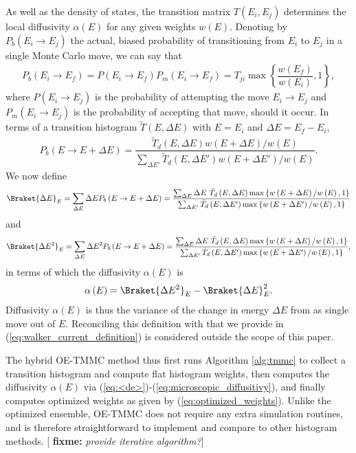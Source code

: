 \documentclass[11pt]{article}
\newcommand{\bk}{\Braket} %
\newcommand{\f}[2]{\dfrac{#1}{#2}} %
\newcommand{\p}[1]{\left(#1\right)} %
\renewcommand{\set}[1]{\left\{#1\right\}} %
\newcommand{\red}[1]{{\bf \color{red} #1}}
\newcommand{\fixme}[1]{[\red{fixme:} \emph{#1}]}
\begin{document}
As well as the density of states, the transition matrix $T\p{E_i,E_j}$
determines the local diffusivity $\alpha\p{E}$ for any given weights
$w\p{E}$. Denoting by $P_b\p{E_i\to E_j}$ the actual, biased
probability of transitioning from $E_i$ to $E_j$ in a single Monte
Carlo move, we can say that
\begin{align}
  P_b\p{E_i\to E_f}=P\p{E_i\to E_f}P_m\p{E_i\to E_f}
  =T_{ji}\max\set{\f{w\p{E_f}}{w\p{E_i}},1},
\end{align}
where $P\p{E_i\to E_j}$ is the probability of attempting the move
$E_i\to E_j$ and $P_m\p{E_i\to E_j}$ is the probability of accepting
that move, should it occur. In terms of a transition histogram $\tilde
T\p{E,\Delta E}$ with $E=E_i$ and $\Delta E=E_f-E_i$,
\begin{align}
  P_b\p{E\to E+\Delta E} =\f{\tilde T_d\p{E,\Delta E}w\p{E+\Delta
      E}/w\p{E}} {\sum_{\Delta E'}\tilde T_d\p{E,\Delta
      E'}w\p{E+\Delta E'}/w\p{E}}.
  \label{eq:actual_transition_prob}
\end{align}
We now define
\begin{align}
  \bk{\Delta E}_E=\sum_{\Delta E}\Delta E P_b\p{E\to E+\Delta E}
  =\f{\sum_{\Delta E}\Delta E~\tilde T_d\p{E,\Delta E}
    \max\set{w\p{E+\Delta E}/w\p{E},1}} {\sum_{\Delta E'}\tilde
    T_d\p{E,\Delta E'} \max\set{w\p{E+\Delta E'}/w\p{E},1}}
  \label{eq:<de>}
\end{align}
and
\begin{align}
  \bk{\Delta E^2}_E=\sum_{\Delta E}\Delta E^2 P_b\p{E\to E+\Delta E}
  =\f{\sum_{\Delta E}\Delta E~\tilde T_d\p{E,\Delta E}
    \max\set{w\p{E+\Delta E}/w\p{E},1}} {\sum_{\Delta E'}\tilde
    T_d\p{E,\Delta E'} \max\set{w\p{E+\Delta E'}/w\p{E},1}},
  \label{eq:<de^2>}
\end{align}
in terms of which the diffusivity $\alpha\p{E}$ is
\begin{align}
  \alpha\p{E}=\bk{\Delta E^2}_E -\bk{\Delta E}_E^2.
  \label{eq:microscopic_diffusitivy}
\end{align}
Diffusivity $\alpha\p{E}$ is thus the variance of the change in energy
$\Delta E$ from as single move out of $E$. Reconciling this definition
with that we provide in (\ref{eq:walker_current_definition}) is
considered outside the scope of this paper.

The hybrid OE-TMMC method thus first runs Algorithm \ref{alg:tmmc} to
collect a transition histogram and compute flat histogram weights,
then computes the diffusivity $\alpha\p{E}$ via
(\ref{eq:<de>})-(\ref{eq:microscopic_diffusitivy}), and finally
computes optimized weights as given by
(\ref{eq:optimized_weights}). Unlike the optimized ensemble, OE-TMMC
does not require any extra simulation routines, and is therefore
straightforward to implement and compare to other histogram methods.
\fixme{provide iterative algorithm?}
\end{document}
